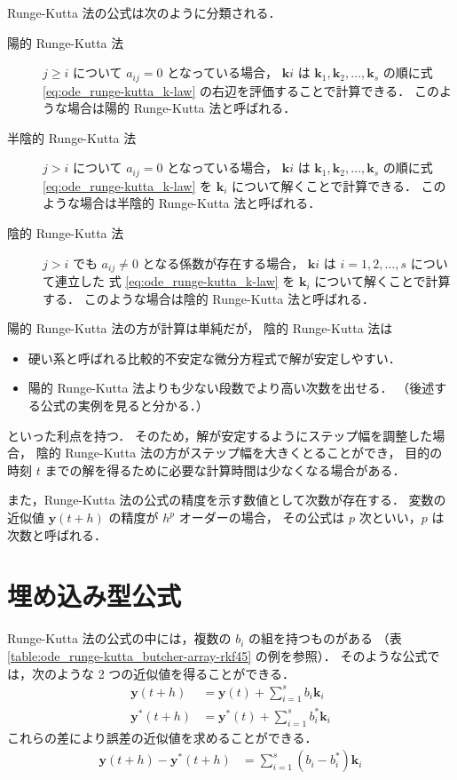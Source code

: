Runge-Kutta 法の公式は次のように分類される．

\begin{description}
    \item[陽的 Runge-Kutta 法] $j \ge i$ について $a_{ij} = 0$ となっている場合，
          $\bm{k}i$ は $\bm{k}_1, \bm{k}_2, \ldots, \bm{k}_s$
          の順に式 \eqref{eq:ode_runge-kutta_k-law} の右辺を評価することで計算できる．
          このような場合は陽的 Runge-Kutta 法と呼ばれる．
    \item[半陰的 Runge-Kutta 法] $j > i$ について $a_{ij} = 0$ となっている場合，
          $\bm{k}i$ は $\bm{k}_1, \bm{k}_2, \ldots, \bm{k}_s$
          の順に式 \eqref{eq:ode_runge-kutta_k-law} を $\bm{k}_i$ について解くことで計算できる．
          このような場合は半陰的 Runge-Kutta 法と呼ばれる．
    \item[陰的 Runge-Kutta 法] $j > i$ でも $a_{ij} \neq 0$ となる係数が存在する場合，
          $\bm{k}i$ は $i = 1, 2, \ldots, s$ について連立した
          式 \eqref{eq:ode_runge-kutta_k-law} を $\bm{k}_i$ について解くことで計算する．
          このような場合は陰的 Runge-Kutta 法と呼ばれる．
\end{description}

陽的 Runge-Kutta 法の方が計算は単純だが，
陰的 Runge-Kutta 法は

\begin{itemize}
    \item 硬い系と呼ばれる比較的不安定な微分方程式で解が安定しやすい．
    \item 陽的 Runge-Kutta 法よりも少ない段数でより高い次数を出せる．
          （後述する公式の実例を見ると分かる．）
\end{itemize}

といった利点を持つ．
そのため，解が安定するようにステップ幅を調整した場合，
陰的 Runge-Kutta 法の方がステップ幅を大きくとることができ，
目的の時刻 $t$ までの解を得るために必要な計算時間は少なくなる場合がある．

また，Runge-Kutta 法の公式の精度を示す数値として次数が存在する．
変数の近似値 $\bm{y}(t + h)$ の精度が $h^p$ オーダーの場合，
その公式は $p$ 次といい，$p$ は次数と呼ばれる．

\section{埋め込み型公式}

Runge-Kutta 法の公式の中には，複数の $b_i$ の組を持つものがある
（表 \ref{table:ode_runge-kutta_butcher-array-rkf45} の例を参照）．
そのような公式では，次のような 2 つの近似値を得ることができる．
\begin{align}
    \bm{y}(t + h)   & = \bm{y}(t) + \sum_{i=1}^s b_i \bm{k}_i     \\
    \bm{y}^*(t + h) & = \bm{y}^*(t) + \sum_{i=1}^s b_i^* \bm{k}_i
\end{align}
これらの差により誤差の近似値を求めることができる．
\begin{align}
    \bm{y}(t + h) - \bm{y}^*(t + h) & = \sum_{i=1}^s (b_i - b_i^*) \bm{k}_i
\end{align}


